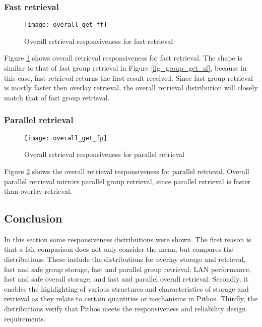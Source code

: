 \subsubsection{Fast retrieval}
\begin{figure}[htbp]
 \centering
 \texttt{[image: overall\_get\_ff]}
 \caption{Overall retrieval responsiveness for fast retrieval}
 \label{fig_overall_get_ff}
\end{figure}
%
Figure \ref{fig_overall_get_ff} shows overall retrieval responsiveness for fast retrieval. The shape is similar to that of fast group retrieval in Figure \ref{fig_group_get_sf}, because in this case, fast retrieval returns the first result received. Since fast group retrieval is mostly faster then overlay retrieval, the overall retrieval distribution will closely match that of fast group retrieval.

\subsubsection{Parallel retrieval}
\begin{figure}[htbp]
 \centering
 \texttt{[image: overall\_get\_fp]}
 \caption{Overall retrieval responsiveness for parallel retrieval}
 \label{fig_overall_get_fp}
\end{figure}
%
Figure \ref{fig_overall_get_fp} shows the overall retrieval responsiveness for parallel retrieval. Overall parallel retrieval mirrors parallel group retrieval, since parallel retrieval is faster than overlay retrieval.

\subsection{Conclusion}

In this section some responsiveness distributions were shown. The first reason is that a fair comparison does not only consider the mean, but compares the distributions. These include the distributions for overlay storage and retrieval, fast and safe group storage, fast and parallel group retrieval, LAN performance, fast and safe overall storage, and fast and parallel overall retrieval. Secondly, it enables the highlighting of various structures and characteristics of storage and retrieval as they relate to certain quantities or mechanisms in Pithos. Thirdly, the distributions verify that Pithos meets the responsiveness and reliability design requirements.
 
